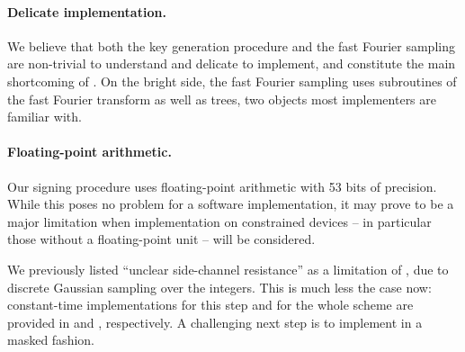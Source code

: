 
\paragraph{Delicate implementation.} We believe that both the key generation procedure and the fast Fourier sampling are non-trivial to understand and delicate to implement, and constitute the main shortcoming of \falcon. On the bright side, the fast Fourier sampling uses subroutines of the fast Fourier transform as well as trees, two objects most implementers are familiar with.

\paragraph{Floating-point arithmetic.} Our signing procedure uses floating-point arithmetic with 53 bits of precision. While this poses no problem for a software implementation, it may prove to be a major limitation when implementation on constrained devices -- in particular those without a floating-point unit -- will be considered.



\medskip

We previously listed ``unclear side-channel resistance'' as a limitation of \falcon, due to discrete Gaussian sampling over the integers. This is much less the case now: constant-time implementations for this step and for the whole scheme are provided in \cite{PQCRYPTO:HPRR20} and \cite{EPRINT:Pornin19}, respectively. A challenging next step is to implement \falcon in a masked fashion.
